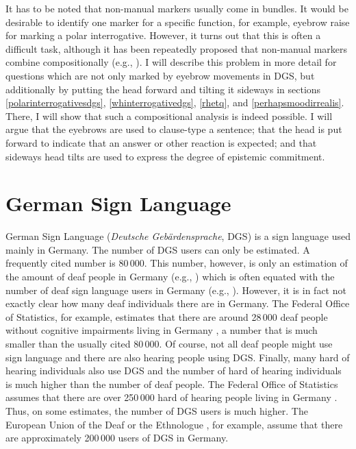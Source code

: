 It has to be noted that non-manual markers usually come in bundles. It would be desirable to identify one marker for a specific function, for example, eyebrow raise for marking a polar interrogative. However, it turns out that this is often a difficult task, although it has been repeatedly proposed that non-manual markers combine compositionally (e.g., \citealt{nespor1999prosody, sandler2006sign, dachkovsky2009visual, herrmann2013modal}). I will describe this problem in more detail for questions which are not only marked by eyebrow movements in DGS, but additionally by putting the head forward and tilting it sideways in sections \ref{polarinterrogativesdgs}, \ref{whinterrogativedgs}, \ref{rhetq}, and \ref{perhapsmoodirrealis}. There, I will show that such a compositional analysis is indeed possible. I will argue that the eyebrows are used to clause-type a sentence; that the head is put forward to indicate that an answer or other reaction is expected; and that sideways head tilts are used to express the degree of epistemic commitment.

\section{German Sign Language}\label{basicclausstructuredgs}


German Sign Language (\textit{Deutsche Gebärdensprache}, DGS) is a sign language used mainly in Germany. The number of DGS users can only be estimated. A frequently cited number is 80\,000. This number, however, is only an estimation of the amount of deaf people in Germany (e.g., \citealt{dgb}) which is often equated with the number of deaf sign language users in Germany (e.g., \citealt{herrmann2007,schwagerzeshan2010}). However, it is in fact not exactly clear how many deaf individuals there are in Germany. The Federal Office of Statistics, for example, estimates that there are around 28\,000 deaf people without cognitive impairments living in Germany \citep{schwerbehindertenstatistik2017}, a number that is much smaller than the usually cited 80\,000. Of course, not all deaf people might use sign language and there are also hearing people using DGS. Finally, many hard of hearing individuals also use DGS and the number of hard of hearing individuals is much higher than the number of deaf people. The Federal Office of Statistics assumes that there are over 250\,000 hard of hearing people living in Germany \citep{schwerbehindertenstatistik2017}. Thus, on some estimates, the number of DGS users is much higher. The European Union of the Deaf \citep{eud2012} or the Ethnologue \citep{simons2018ethnologue}, for example, assume that there are approximately 200\,000 users of DGS in Germany.

